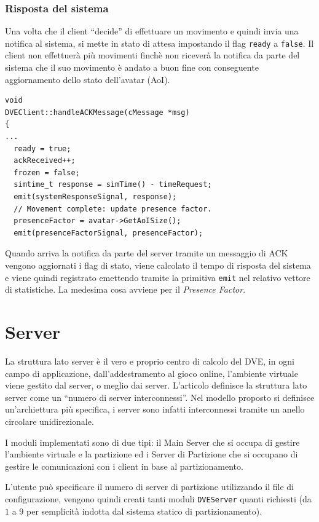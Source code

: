\documentclass[a4paper, 11pt, oneside]{book}
\theoremstyle{definition}
\theoremstyle{remark}
\begin{document}
\subsubsection{Risposta del sistema}
Una volta che il client ``decide'' di effettuare un movimento e quindi invia
una notifica al sistema, si mette in stato di attesa impostando il flag
\texttt{ready} a \texttt{false}. Il client non effettuerà più movimenti finchè
non riceverà la notifica da parte del sistema che il suo movimento è andato a
buon fine con conseguente aggiornamento dello stato dell'avatar (AoI).
\begin{lstlisting}
void
DVEClient::handleACKMessage(cMessage *msg)
{
...
  ready = true;
  ackReceived++;
  frozen = false;
  simtime_t response = simTime() - timeRequest;
  emit(systemResponseSignal, response);
  // Movement complete: update presence factor.
  presenceFactor = avatar->GetAoISize();
  emit(presenceFactorSignal, presenceFactor);
\end{lstlisting}
Quando arriva la notifica da parte del server tramite un messaggio di ACK
vengono aggiornati i flag di stato, viene calcolato il tempo di risposta
del sistema e viene quindi registrato emettendo tramite la primitiva
\texttt{emit} nel relativo vettore di statistiche. La medesima cosa avviene
per il \emph{Presence Factor}.

\section{Server}
La struttura lato server è il vero e proprio centro di calcolo del DVE, in
ogni campo di applicazione, dall'addestramento al gioco online, l'ambiente
virtuale viene gestito dal server, o meglio dai server.
L'articolo
\cite{IDVE}
definisce la struttura lato server come un ``numero di
server interconnessi''. Nel modello proposto si definisce un'archiettura più
specifica, i server sono infatti interconnessi tramite un anello circolare
unidirezionale.

I moduli implementati sono di due tipi: il Main Server che si occupa di gestire
l'ambiente virtuale e la partizione ed i Server di Partizione che si occupano
di gestire le comunicazioni con i client in base al partizionamento.

L'utente può specificare il numero di server di partizione
utilizzando il file di configurazione, vengono quindi creati tanti moduli
\texttt{DVEServer} quanti richiesti (da $1$ a $9$ per semplicità
indotta dal sistema statico di partizionamento).
\end{document}
